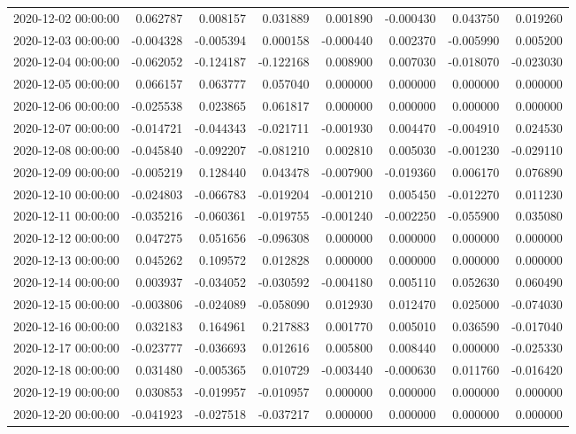 \begin{tabular}{lrrrrrrr}
2020-12-02 00:00:00 & 0.062787 & 0.008157 & 0.031889 & 0.001890 & -0.000430 & 0.043750 & 0.019260 \\
2020-12-03 00:00:00 & -0.004328 & -0.005394 & 0.000158 & -0.000440 & 0.002370 & -0.005990 & 0.005200 \\
2020-12-04 00:00:00 & -0.062052 & -0.124187 & -0.122168 & 0.008900 & 0.007030 & -0.018070 & -0.023030 \\
2020-12-05 00:00:00 & 0.066157 & 0.063777 & 0.057040 & 0.000000 & 0.000000 & 0.000000 & 0.000000 \\
2020-12-06 00:00:00 & -0.025538 & 0.023865 & 0.061817 & 0.000000 & 0.000000 & 0.000000 & 0.000000 \\
2020-12-07 00:00:00 & -0.014721 & -0.044343 & -0.021711 & -0.001930 & 0.004470 & -0.004910 & 0.024530 \\
2020-12-08 00:00:00 & -0.045840 & -0.092207 & -0.081210 & 0.002810 & 0.005030 & -0.001230 & -0.029110 \\
2020-12-09 00:00:00 & -0.005219 & 0.128440 & 0.043478 & -0.007900 & -0.019360 & 0.006170 & 0.076890 \\
2020-12-10 00:00:00 & -0.024803 & -0.066783 & -0.019204 & -0.001210 & 0.005450 & -0.012270 & 0.011230 \\
2020-12-11 00:00:00 & -0.035216 & -0.060361 & -0.019755 & -0.001240 & -0.002250 & -0.055900 & 0.035080 \\
2020-12-12 00:00:00 & 0.047275 & 0.051656 & -0.096308 & 0.000000 & 0.000000 & 0.000000 & 0.000000 \\
2020-12-13 00:00:00 & 0.045262 & 0.109572 & 0.012828 & 0.000000 & 0.000000 & 0.000000 & 0.000000 \\
2020-12-14 00:00:00 & 0.003937 & -0.034052 & -0.030592 & -0.004180 & 0.005110 & 0.052630 & 0.060490 \\
2020-12-15 00:00:00 & -0.003806 & -0.024089 & -0.058090 & 0.012930 & 0.012470 & 0.025000 & -0.074030 \\
2020-12-16 00:00:00 & 0.032183 & 0.164961 & 0.217883 & 0.001770 & 0.005010 & 0.036590 & -0.017040 \\
2020-12-17 00:00:00 & -0.023777 & -0.036693 & 0.012616 & 0.005800 & 0.008440 & 0.000000 & -0.025330 \\
2020-12-18 00:00:00 & 0.031480 & -0.005365 & 0.010729 & -0.003440 & -0.000630 & 0.011760 & -0.016420 \\
2020-12-19 00:00:00 & 0.030853 & -0.019957 & -0.010957 & 0.000000 & 0.000000 & 0.000000 & 0.000000 \\
2020-12-20 00:00:00 & -0.041923 & -0.027518 & -0.037217 & 0.000000 & 0.000000 & 0.000000 & 0.000000 \\

\end{tabular}
